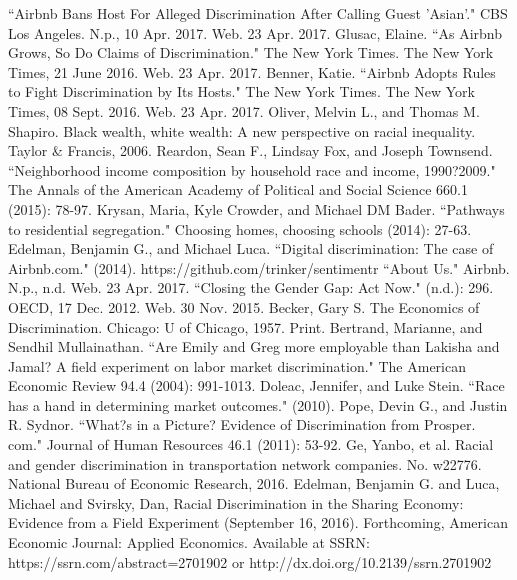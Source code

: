 \documentclass[11pt, oneside]{article}
\begin{document}
\newpage

\begin{thebibliography}{16} 
``Airbnb Bans Host For Alleged Discrimination After Calling Guest 'Asian'." CBS Los Angeles. N.p., 10 Apr. 2017. Web. 23 Apr. 2017.
Glusac, Elaine. ``As Airbnb Grows, So Do Claims of Discrimination." The New York Times. The New York Times, 21 June 2016. Web. 23 Apr. 2017.
Benner, Katie. ``Airbnb Adopts Rules to Fight Discrimination by Its Hosts." The New York Times. The New York Times, 08 Sept. 2016. Web. 23 Apr. 2017.
Oliver, Melvin L., and Thomas M. Shapiro. Black wealth, white wealth: A new perspective on racial inequality. Taylor \& Francis, 2006.
Reardon, Sean F., Lindsay Fox, and Joseph Townsend. ``Neighborhood income composition by household race and income, 1990?2009." The Annals of the American Academy of Political and Social Science 660.1 (2015): 78-97.
Krysan, Maria, Kyle Crowder, and Michael DM Bader. ``Pathways to residential segregation." Choosing homes, choosing schools (2014): 27-63.
Edelman, Benjamin G., and Michael Luca. ``Digital discrimination: The case of Airbnb.com." (2014).
https://github.com/trinker/sentimentr
``About Us." Airbnb. N.p., n.d. Web. 23 Apr. 2017.
``Closing the Gender Gap: Act Now." (n.d.): 296. OECD, 17 Dec. 2012. Web. 30 Nov. 2015.
Becker, Gary S. The Economics of Discrimination. Chicago: U of Chicago, 1957. Print.
Bertrand, Marianne, and Sendhil Mullainathan. ``Are Emily and Greg more employable than Lakisha and Jamal? A field experiment on labor market discrimination." The American Economic Review 94.4 (2004): 991-1013.
Doleac, Jennifer, and Luke Stein. ``Race has a hand in determining market outcomes." (2010).
Pope, Devin G., and Justin R. Sydnor. ``What?s in a Picture? Evidence of Discrimination from Prosper. com." Journal of Human Resources 46.1 (2011): 53-92.
Ge, Yanbo, et al. Racial and gender discrimination in transportation network companies. No. w22776. National Bureau of Economic Research, 2016.
Edelman, Benjamin G. and Luca, Michael and Svirsky, Dan, Racial Discrimination in the Sharing Economy: Evidence from a Field Experiment (September 16, 2016). Forthcoming, American Economic Journal: Applied Economics. Available at SSRN: https://ssrn.com/abstract=2701902 or http://dx.doi.org/10.2139/ssrn.2701902

\end{thebibliography}
\end{document}
